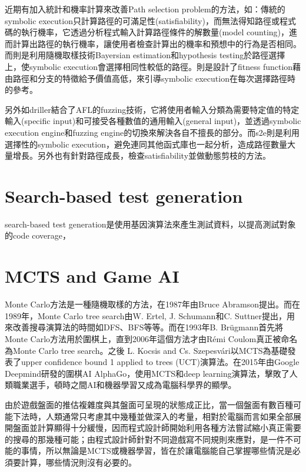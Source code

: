 \documentclass[12pt,a4paper,oneside]{book}
\begin{document}
近期有加入統計和機率計算來改善Path selection problem的方法，如\cite{probabilistic}：傳統的symbolic execution只計算路徑的可滿足性(satisfiability)，而無法得知路徑或程式碼的執行機率，它透過分析程式輸入計算路徑條件的解數量(model counting)，進而計算出路徑的執行機率，讓使用者檢查計算出的機率和預想中的行為是否相同。而\cite{StatisticalSymbolicExecution}則是利用隨機取樣技術Bayersian estimation和hypothesis testing於路徑選擇上，使symbolic execution會選擇相同性較低的路徑。\cite{FitnessGuided}則是設計了fitness function藉由路徑和分支的特徵給予價值高低，來引導symbolic execution在每次選擇路徑時的參考。

另外如driller\cite{stephens2016driller}結合了AFL\cite{AFL}的fuzzing技術，它將使用者輸入分類為需要特定值的特定輸入(specific input)和可接受各種數值的通用輸入(general input)，並透過symbolic execution engine和fuzzing engine的切換來解決各自不擅長的部分。而s2e\cite{chipounov2012s2e}則是利用選擇性的symbolic execution，避免連同其他函式庫也一起分析，造成路徑數量大量增長。另外也有針對路徑成長，檢查satisfiability並做動態剪枝的方法\cite{PathPruning}。

\section{Search-based test generation}

search-based test generation是使用基因演算法來產生測試資料，以提高測試對象的code coverage，

\section{MCTS and Game AI}

Monte Carlo方法是一種隨機取樣的方法，在1987年由Bruce Abramson提出\cite{mcmethod}。而在1989年，Monte Carlo tree search由W. Ertel, J. Schumann和C. Suttner提出，用來改善搜尋演算法的時間如DFS、BFS等等。而在1993年B. Brügmann首先將Monte Carlo方法用於圍棋上\cite{mc_go}，直到2006年這個方法才由Rémi Coulom真正被命名為Monte Carlo tree search\cite{MCTS_naming}。之後 L. Kocsis and Cs. Szepesvári以MCTS為基礎發表了upper confidence bound 1 applied to trees (UCT)演算法\cite {UCT}。在2015年由Google Deepmind研發的圍棋AI AlphaGo\cite{alphago}，使用MCTS和deep learning演算法，擊敗了人類職業選手，頓時之間AI和機器學習又成為電腦科學界的顯學。

由於遊戲盤面的推估複雜度與其盤面可呈現的狀態成正比，當一個盤面有數百種可能下法時，人類通常只考慮其中幾種並做深入的考量，相對於電腦而言如果全部展開盤面並計算顯得十分緩慢，因而程式設計師開始利用各種方法嘗試縮小真正需要的搜尋的那幾種可能；由程式設計師針對不同遊戲寫不同規則來應對，是一件不可能的事情，所以無論是MCTS或機器學習，皆在於讓電腦能自己掌握哪些情況是必須要計算，哪些情況則沒有必要的。
\end{document}
